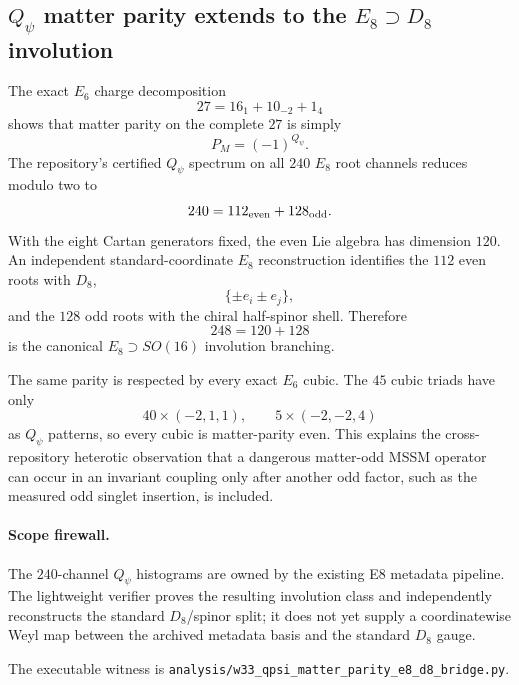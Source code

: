 \subsection*{$Q_\psi$ matter parity extends to the $E_8\supset D_8$ involution}

The exact $E_6$ charge decomposition
\[
27=16_1+10_{-2}+1_4
\]
shows that matter parity on the complete $27$ is simply
\[
P_M=(-1)^{Q_\psi}.
\]
The repository's certified $Q_\psi$ spectrum on all $240$ $E_8$ root
channels reduces modulo two to
\[
240=112_{\rm even}+128_{\rm odd}.
\]
With the eight Cartan generators fixed, the even Lie algebra has dimension
$120$.  An independent standard-coordinate $E_8$ reconstruction identifies
the $112$ even roots with $D_8$,
\[
\{\pm e_i\pm e_j\},
\]
and the $128$ odd roots with the chiral half-spinor shell.  Therefore
\[
\boxed{248=120+128}
\]
is the canonical $E_8\supset SO(16)$ involution branching.

The same parity is respected by every exact $E_6$ cubic.  The $45$ cubic
triads have only
\[
40\times(-2,1,1),\qquad 5\times(-2,-2,4)
\]
as $Q_\psi$ patterns, so every cubic is matter-parity even.  This explains
the cross-repository heterotic observation that a dangerous matter-odd MSSM
operator can occur in an invariant coupling only after another odd factor,
such as the measured odd singlet insertion, is included.

\paragraph{Scope firewall.}
The $240$-channel $Q_\psi$ histograms are owned by the existing E8 metadata
pipeline.  The lightweight verifier proves the resulting involution class and
independently reconstructs the standard $D_8$/spinor split; it does not yet
supply a coordinatewise Weyl map between the archived metadata basis and the
standard $D_8$ gauge.

The executable witness is
\texttt{analysis/w33\_qpsi\_matter\_parity\_e8\_d8\_bridge.py}.
